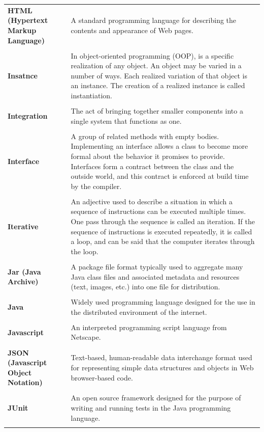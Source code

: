 \documentclass[a4paper,11pt,twoside]{report}
\theoremstyle{definition}
\begin{document}
\begin{longtable}{p{4cm} p{11cm}}
\textbf{HTML (Hypertext Markup Language)} & A standard programming language for describing the contents and appearance of Web pages.\\ \\
\textbf{Insatnce} & In object-oriented programming (OOP), is a specific realization of any object. An object may be varied in a number of ways. Each realized variation of that object is an instance. The creation of a realized instance is called instantiation.\\ \\
\textbf{Integration} & The act of bringing together smaller components into a single system that functions as one.\\ \\
\textbf{Interface} & A group of related methods with empty bodies. Implementing an interface allows a class to become more formal about the behavior it promises to provide. Interfaces form a contract between the class and the outside world, and this contract is enforced at build time by the compiler.\\ \\
\textbf{Iterative} & An adjective used to describe a situation in which a sequence of instructions can be executed multiple times. One pass through the sequence is called an iteration. If the sequence of instructions is executed repeatedly, it is called a loop, and can be said that the computer iterates through the loop.\\ \\
\textbf{Jar (Java Archive) } & A package file format typically used to aggregate many Java class files and associated metadata and resources (text, images, etc.) into one file for distribution. \\ \\
\textbf{Java} & Widely used programming language designed for the use in the distributed environment of the internet.\\ \\
\textbf{Javascript} & An interpreted programming script language from Netscape.\\ \\
\textbf{JSON (Javascript Object Notation)} & Text-based, human-readable data interchange format used for representing simple data structures and objects in Web browser-based code.\\ \\
\textbf{JUnit} & An open source framework designed for the purpose of writing and running tests in the Java programming language.\\ \\


\end{longtable}
\end{document}
